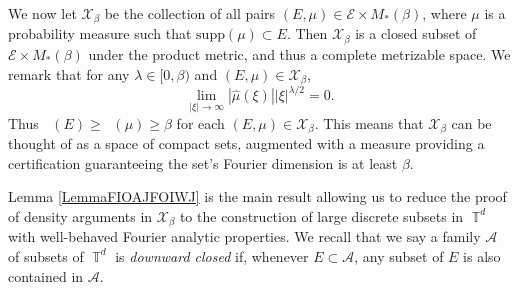 \documentclass[dvipsnames,letterpaper,12pt]{article}
\numberwithin{equation}{section}
\DeclareMathOperator{\fordim}{\dim_{\mathbb{F}}}
\DeclareMathOperator{\TT}{\mathbb{T}}
\newtheorem{theorem}{Theorem}
\numberwithin{theorem}{section}
\begin{document}
We now let $\mathcal{X}_\beta$ be the collection of all pairs $(E,\mu) \in \mathcal{E} \times M_*(\beta)$, where $\mu$ is a probability measure such that $\text{supp}(\mu) \subset E$. Then $\mathcal{X}_\beta$ is a closed subset of $\mathcal{E} \times M_*(\beta)$ under the product metric, and thus a complete metrizable space. We remark that for any $\lambda \in [0,\beta)$ and $(E,\mu) \in \mathcal{X}_\beta$,
%
\begin{equation} \label{equationGFSCSC4}
    \lim_{|\xi| \to \infty} |\widehat{\mu}(\xi)| |\xi|^{\lambda/2} = 0.
\end{equation}
%
Thus $\fordim(E) \geq \fordim(\mu) \geq \beta$ for each $(E,\mu) \in \mathcal{X}_\beta$. This means that $\mathcal{X}_\beta$ can be thought of as a space of compact sets, augmented with a measure providing a certification guaranteeing the set's Fourier dimension is at least $\beta$.

\begin{comment}
\begin{theorem}
    $\mathcal{X}$ is a closed subset of $\mathcal{E} \times M(\beta)$.
\end{theorem}
\begin{proof}
    Suppose $\{ (E_k,\mu_k) \}$ is a sequence of elements of $\mathcal{X}$ converging to some tuple $(E,\mu) \in \mathcal{E} \times M(\beta)$. Fix $\varepsilon > 0$. Since $E_k \to E$ in the Hausdorff dimension, there exists $k_0$ such that for $k \geq k_0$, $E_k \subset E(\varepsilon)$. Since $\mu_k \to \mu$ weakly, this implies that $\mu$ is a probability measure, and that $\text{supp}(\mu) \subset E(\varepsilon)$. Taking $\varepsilon \to 0$ shows that $\text{supp}(\mu) \subset E$. Again for a fixed $\varepsilon > 0$, applying the triangle inequality and the reverse triangle inequality combined with \eqref{equationGFSCSC4} applied to $\mu_k$, we conclude
    \[ \lim_{|\xi| \to \infty} |\xi|^{\beta/2 - \varepsilon} |\widehat{\mu}(\xi)| = \lim_{|\xi| \to \infty} |\xi|^{\beta/2 - \varepsilon} |\widehat{\mu}(\xi) - \widehat{\mu_k}(\xi)| \leq \| \mu - \mu_k \|_{M(\beta,\varepsilon)}. \]
    Taking $k \to \infty$ shows that
    \[ \lim_{|\xi| \to \infty} |\xi|^{\beta/2 - \varepsilon} |\widehat{\mu}(\xi)| = 0, \]
    which completes the proof.
\end{proof}
\end{comment}

Lemma \ref{LemmaFIOAJFOIWJ} is the main result allowing us to reduce the proof of density arguments in $\mathcal{X}_\beta$ to the construction of large discrete subsets in $\TT^d$ with well-behaved Fourier analytic properties. We recall that we say a family $\mathcal{A}$ of subsets of $\TT^d$ is \emph{downward closed} if, whenever $E \subset \mathcal{A}$, any subset of $E$ is also contained in $\mathcal{A}$.
\end{document}
